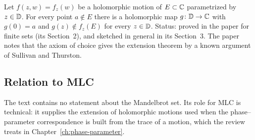 \begin{theorem}
\label{thm:slodkowski-1-4}
Let $f(z,w)=f_z(w)$ be a holomorphic motion of $E\subset\mathbb C$ parametrized by $z\in\mathbb D$.  For every point $a\notin E$ there is a
holomorphic map $g\colon\mathbb D\to\mathbb C$ with $g(0)=a$ and $g(z)\notin f_z(E)$ for every $z\in\mathbb D$.  Status: proved in the paper for
finite sets (its Section~2), and sketched in general in its Section~3.  The paper notes that the axiom of choice gives the
extension theorem by a known argument of Sullivan and Thurston.
\end{theorem}

\subsection*{Relation to MLC}

The text contains no statement about the Mandelbrot set.  Its role for MLC is technical: it supplies the extension of holomorphic motions
used when the phase--parameter correspondence is built from the trace of a motion, which the review treats in
Chapter~\ref{ch:phase-parameter}.
